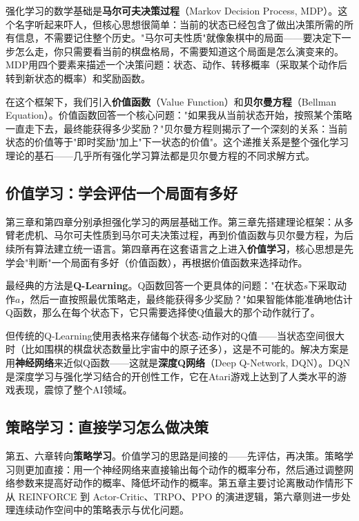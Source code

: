 \documentclass[lang=cn,zihao=-4,a4paper,fontset=windows]{beautybook}
\begin{document}
{强化学习的数学基础是\textbf{马尔可夫决策过程}（Markov Decision Process, MDP）。这个名字听起来吓人，但核心思想很简单：当前的状态已经包含了做出决策所需的所有信息，不需要记住整个历史。"马尔可夫性质"就像象棋中的局面——要决定下一步怎么走，你只需要看当前的棋盘格局，不需要知道这个局面是怎么演变来的。MDP用四个要素来描述一个决策问题：状态、动作、转移概率（采取某个动作后转到新状态的概率）和奖励函数。

在这个框架下，我们引入\textbf{价值函数}（Value Function）和\textbf{贝尔曼方程}（Bellman Equation）。价值函数回答一个核心问题："如果我从当前状态开始，按照某个策略一直走下去，最终能获得多少奖励？"贝尔曼方程则揭示了一个深刻的关系：当前状态的价值等于"即时奖励"加上"下一状态的价值"。这个递推关系是整个强化学习理论的基石——几乎所有强化学习算法都是贝尔曼方程的不同求解方式。

\subsection*{价值学习：学会评估一个局面有多好}

第三章和第四章分别承担强化学习的两层基础工作。第三章先搭建理论框架：从多臂老虎机、马尔可夫性质到马尔可夫决策过程，再到价值函数与贝尔曼方程，为后续所有算法建立统一语言。第四章再在这套语言之上进入\textbf{价值学习}，核心思想是先学会"判断"一个局面有多好（价值函数），再根据价值函数来选择动作。

最经典的方法是\textbf{Q-Learning}。Q函数回答一个更具体的问题："在状态$s$下采取动作$a$，然后一直按照最优策略走，最终能获得多少奖励？"如果智能体能准确地估计Q函数，那么在每个状态下，它只需要选择使Q值最大的那个动作就行了。

但传统的Q-Learning使用表格来存储每个状态-动作对的Q值——当状态空间很大时（比如围棋的棋盘状态数量比宇宙中的原子还多），这是不可能的。解决方案是用\textbf{神经网络}来近似Q函数——这就是\textbf{深度Q网络}（Deep Q-Network, DQN）。DQN是深度学习与强化学习结合的开创性工作，它在Atari游戏上达到了人类水平的游戏表现，震惊了整个AI领域。

\subsection*{策略学习：直接学习怎么做决策}

第五、六章转向\textbf{策略学习}。价值学习的思路是间接的——先评估，再决策。策略学习则更加直接：用一个神经网络来直接输出每个动作的概率分布，然后通过调整网络参数来提高好动作的概率、降低坏动作的概率。第五章主要讨论离散动作情形下从 REINFORCE 到 Actor-Critic、TRPO、PPO 的演进逻辑，第六章则进一步处理连续动作空间中的策略表示与优化问题。

}
\end{document}
